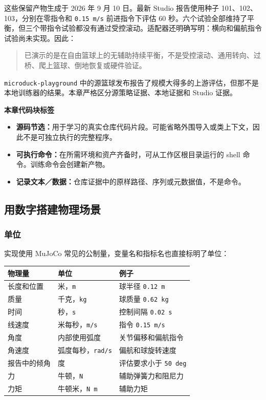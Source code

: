\documentclass[
  chinese,
  11pt,
  letterpaper,
]{article}
\newcounter{none} %
\providecommand{\tightlist}{%
  \setlength{\itemsep}{0pt}\setlength{\parskip}{0pt}}
\begin{document}
这些保留产物生成于 2026 年 9 月 10 日。最新 Studio 报告使用种子
101、102、103，分别在零指令和 \texttt{0.15\ m/s} 前进指令下评估 60
秒。六个试验全部维持了平衡，但三个带指令试验都没有通过受控滚动。适配器还明确写明：横向和偏航指令试验尚未实现。因此：

\begin{quote}
已演示的是在自由篮球上的无辅助持续平衡，不是受控滚动、通用转向、过桥、爬上篮球、倒地恢复或硬件验证。
\end{quote}

\texttt{microduc\allowbreak{}k-\allowbreak{}playgrou\allowbreak{}nd}
中的源篮球发布报告了规模大得多的上游评估，但那不是本地训练器的结果。本章严格区分源策略证据、本地证据和
Studio 证据。

\textbf{本章代码块标签}

\begin{itemize}
\tightlist
\item
  \textbf{源码节选：}用于学习的真实仓库代码片段。可能省略外围导入或类上下文，因此不是可独立执行的完整程序。
\item
  \textbf{可执行命令：}在所需环境和资产齐备时，可从工作区根目录运行的
  shell 命令。训练命令会创建新产物。
\item
  \textbf{记录文本／数据：}仓库证据中的原样路径、序列或元数据值，不是命令。
\end{itemize}

\subsection{用数字搭建物理场景}\label{ux7528ux6570ux5b57ux642dux5efaux7269ux7406ux573aux666f}

\subsubsection{单位}\label{ux5355ux4f4d}

实现使用 MuJoCo 常见的公制量，变量名和指标名也直接标明了单位：

{\def\LTcaptype{none} %
\begin{longtable}[]{@{}lll@{}}
\toprule\noalign{}
物理量 & 单位 & 例子 \\
\midrule\noalign{}
\endhead
\bottomrule\noalign{}
\endlastfoot
长度和位置 & 米，\texttt{m} & 球半径 \texttt{0.12\ m} \\
质量 & 千克，\texttt{kg} & 球质量 \texttt{0.62\ kg} \\
时间 & 秒，\texttt{s} & 控制间隔 \texttt{0.02\ s} \\
线速度 & 米每秒，\texttt{m/s} & 指令 \texttt{0.15\ m/s} \\
角度 & 内部使用弧度 & 关节偏移和偏航指令 \\
角速度 & 弧度每秒，\texttt{rad/s} & 偏航和球旋转速度 \\
报告中的倾角 & 度 & 评估要求小于 \texttt{50\ deg} \\
力 & 牛顿，\texttt{N} & 辅助弹簧力和阻尼力 \\
力矩 & 牛顿米，\texttt{N\ m} & 辅助力矩 \\
\end{longtable}
}
\end{document}
